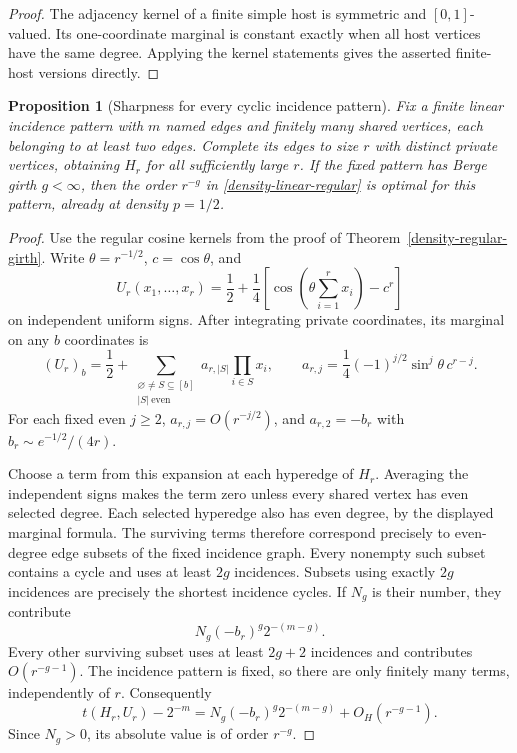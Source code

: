 \documentclass[a4paper,11pt,reqno]{amsart}
\theoremstyle{plain}
\newtheorem{proposition}[theorem]{Proposition}
\theoremstyle{definition}
\theoremstyle{remark}
\begin{document}
\begin{proof}
The adjacency kernel of a finite simple host is symmetric and
$[0,1]$-valued.  Its one-coordinate marginal is constant exactly
when all host vertices have the same degree.  Applying the kernel
statements gives the asserted finite-host versions directly.
\end{proof}

\begin{proposition}[Sharpness for every cyclic incidence pattern]
\label{density-linear-sharpness}
Fix a finite linear incidence pattern with $m$ named edges and
finitely many shared vertices, each belonging to at least two
edges.  Complete its edges to size $r$ with distinct private
vertices, obtaining $H_r$ for all sufficiently large $r$.
If the fixed pattern has Berge girth $g<\infty$, then the order
$r^{-g}$ in \eqref{density-linear-regular} is optimal for this
pattern, already at density $p=1/2$.
\end{proposition}
\begin{proof}
Use the regular cosine kernels from the proof of
Theorem~\ref{density-regular-girth}.  Write
$\theta=r^{-1/2}$, $c=\cos\theta$, and
\[
 U_r(x_1,\ldots,x_r)
 =\frac12+\frac14\left[
    \cos\!\left(\theta\sum_{i=1}^r x_i\right)-c^r\right]
\]
on independent uniform signs.  After integrating private
coordinates, its marginal on any $b$ coordinates is
\[
 (U_r)_b=\frac12+
  \sum_{\substack{\varnothing\ne S\subseteq[b]\\|S|\ \mathrm{even}}}
      a_{r,|S|}\prod_{i\in S}x_i,
 \qquad
 a_{r,j}=\frac14(-1)^{j/2}\sin^j\theta\,c^{r-j}.
\]
For each fixed even $j\ge2$, $a_{r,j}=O(r^{-j/2})$, and
$a_{r,2}=-b_r$ with $b_r\sim e^{-1/2}/(4r)$.

Choose a term from this expansion at each hyperedge of $H_r$.
Averaging the independent signs makes the term zero unless every
shared vertex has even selected degree.  Each selected hyperedge
also has even degree, by the displayed marginal formula.  The
surviving terms therefore correspond precisely to even-degree
edge subsets of the fixed incidence graph.  Every nonempty such
subset contains a cycle and uses at least $2g$ incidences.
Subsets using exactly $2g$ incidences are precisely the shortest
incidence cycles.  If $N_g$ is their number, they contribute
\[
 N_g(-b_r)^g2^{-(m-g)}.
\]
Every other surviving subset uses at least $2g+2$ incidences and
contributes $O(r^{-g-1})$.  The incidence pattern is fixed, so
there are only finitely many terms, independently of $r$.
Consequently
\[
 t(H_r,U_r)-2^{-m}
  =N_g(-b_r)^g2^{-(m-g)}+O_H(r^{-g-1}).
\]
Since $N_g>0$, its absolute value is of order $r^{-g}$.
\end{proof}
\end{document}
